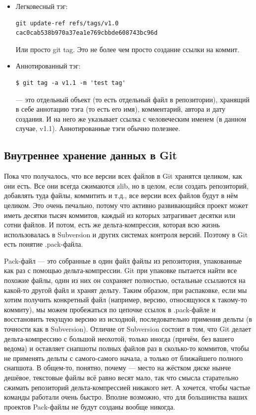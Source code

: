 \documentclass[a5paper]{article}
\begin{document}
\begin{itemize}
	\item Легковесный тэг:
		\begin{verbatim}
git update-ref refs/tags/v1.0 cac0cab538b970a37ea1e769cbbde608743bc96d
		\end{verbatim}
		Или просто git tag. Это не более чем просто создание ссылки на коммит.
	\item Аннотированный тэг:
		\begin{verbatim}
$ git tag -a v1.1 -m 'test tag'
		\end{verbatim}
		--- это отдельный объект (то есть отдельный файл в репозитории), хранящий в себе аннотацию тэга (то есть его имя), комментарий, автора и дату создания. И на него же указывает ссылка с человеческим именем (в данном случае, v1.1). Аннотированные тэги обычно полезнее.
\end{itemize}

\subsection{Внутреннее хранение данных в Git}

Пока что получалось, что все версии всех файлов в Git хранятся целиком, как они есть. Все они всегда сжимаются zlib, но в целом, если создать репозиторий, добавлять туда файлы, коммитить и т.д., все версии всех файлов будут в нём целиком. Это очень печально, потому что активно развивающийся проект может иметь десятки тысяч коммитов, каждый из которых затрагивает десятки или сотни файлов. И потом, есть же дельта-компрессия, которая всю жизнь использовалась в Subversion и других системах контроля версий. Поэтому в Git есть понятие .pack-файла. 

Pack-файл --- это собранные в один файл файлы из репозитория, упакованные как раз с помощью дельта-компрессии. Git при упаковке пытается найти все похожие файлы, один из них он сохраняет полностью, остальные ссылаются на какой-то другой файл и хранят дельту. Таким образом, при распаковке, если мы хотим получить конкретный файл (например, версию, относящуюся к такому-то коммиту), мы можем пробежаться по цепочке ссылок в .pack-файле и восстановить текущую версию из исходной, последовательно применив дельты (в точности как в Subversion). Отличие от Subversion состоит в том, что Git делает дельта-компрессию с большой неохотой, только иногда (причём, без вашего ведома) и оставляет снапшоты полных файлов раз в сколько-то коммитов, чтобы не применять дельты с самого-самого начала, а только от ближайшего полного снапшота. В общем-то, понятно, почему --- место на жёстком диске нынче дешёвое, текстовые файлы всё равно весят мало, так что смысла старательно сжимать репозиторий дельта-компрессией никакого нет. А хочется, чтобы частые команды работали очень быстро. Вполне возможно, что для большинства ваших проектов Pack-файлы не будут созданы вообще никогда.
\end{document}
